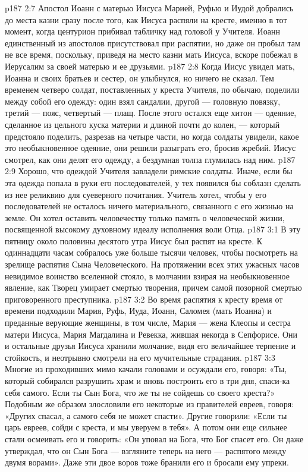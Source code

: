 \vs p187 2:7 Апостол Иоанн с матерью Иисуса Марией, Руфью и Иудой добрались до места казни сразу после того, как Иисуса распяли на кресте, именно в тот момент, когда центурион прибивал табличку над головой у Учителя. Иоанн единственный из апостолов присутствовал при распятии, но даже он пробыл там не все время, поскольку, приведя на место казни мать Иисуса, вскоре побежал в Иерусалим за своей матерью и ее друзьями.
\vs p187 2:8 Когда Иисус увидел мать, Иоанна и своих братьев и сестер, он улыбнулся, но ничего не сказал. Тем временем четверо солдат, поставленных у креста Учителя, по обычаю, поделили между собой его одежду: один взял сандалии, другой --- головную повязку, третий --- пояс, четвертый --- плащ. После этого остался еще хитон --- одеяние, сделанное из цельного куска материи и длиной почти до колен, --- который предстояло поделить, разрезав на четыре части, но когда солдаты увидели, какое это необыкновенное одеяние, они решили разыграть его, бросив жребий. Иисус смотрел, как они делят его одежду, а бездумная толпа глумилась над ним.
\vs p187 2:9 \pc Хорошо, что одеждой Учителя завладели римские солдаты. Иначе, если бы эта одежда попала в руки его последователей, у тех появился бы соблазн сделать из нее реликвию для суеверного почитания. Учитель хотел, чтобы у его последователей не осталось ничего материального, связанного с его жизнью на земле. Он хотел оставить человечеству только память о человеческой жизни, посвященной высокому духовному идеалу исполнения воли Отца.
\vs p187 3:1 В эту пятницу около половины десятого утра Иисус был распят на кресте. К одиннадцати часам собралось уже больше тысячи человек, чтобы посмотреть на зрелище распятия Сына Человеческого. На протяжении всех этих ужасных часов невидимое воинство вселенной стояло, в молчании взирая на необыкновенное явление, как Творец умирает смертью творения, причем самой позорной смертью приговоренного преступника.
\vs p187 3:2 Во время распятия к кресту время от времени подходили Мария, Руфь, Иуда, Иоанн, Саломея (мать Иоанна) и преданные верующие женщины, в том числе, Мария --- жена Клеопы и сестра матери Иисуса, Мария Магдалина и Ревекка, жившая некогда в Сепфорисе. Они и остальные друзья Иисуса хранили молчание, видя его величайшее терпение и стойкость, и неотрывно смотрели на его мучительные страдания.
\vs p187 3:3 Многие из проходивших мимо качали головами и осуждали его, говоря: «Ты, который собирался разрушить храм и вновь построить его в три дня, спаси\hyp{}ка себя самого. Если ты Сын Бога, что же ты не сойдешь со своего креста?» Подобным же образом злословили его некоторые из правителей евреев, говоря: «Других спасал, а самого себя не может спасти». Другие говорили: «Если ты царь евреев, сойди с креста, и мы уверуем в тебя». А потом они еще сильнее стали осмеивать его и говорить: «Он уповал на Бога, что Бог спасет его. Он даже утверждал, что он Сын Бога --- взгляните теперь на него --- распятого между двумя ворами». Даже эти двое воров тоже бранили его и бросали ему упреки.
